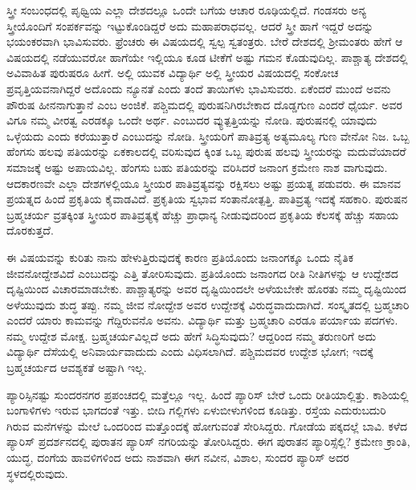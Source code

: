 ಸ್ತ್ರೀ ಸಂಬಂಧದಲ್ಲಿ ಪೃಥ್ವಿಯ ಎಲ್ಲಾ ದೇಶದಲ್ಲೂ ಒಂದೇ ಬಗೆಯ ಆಚಾರ ರೂಢಿಯಲ್ಲಿದೆ. ಗಂಡಸರು ಅನ್ಯ ಸ್ತ್ರೀಯೊಂದಿಗೆ ಸಂಪರ್ಕವನ್ನು ಇಟ್ಟುಕೊಂಡಿದ್ದರೆ ಅದು ಮಹಾಪರಾಧವಲ್ಲ. ಆದರೆ ಸ್ತ್ರೀ ಹಾಗೆ ಇದ್ದರೆ ಅದನ್ನು ಭಯಂಕರವಾಗಿ ಭಾವಿಸುವರು. ಫ್ರೆಂಚರು ಈ ವಿಷಯದಲ್ಲಿ ಸ್ವಲ್ಪ ಸ್ವತಂತ್ರರು. ಬೇರೆ ದೇಶದಲ್ಲಿ ಶ‍್ರೀಮಂತರು ಹೇಗೆ ಆ ವಿಷಯದಲ್ಲಿ ನಡೆಯುವರೋ ಹಾಗೆಯೇ ಇಲ್ಲಿಯೂ ಕೂಡ ಟೀಕೆಗೆ ಅಷ್ಟು ಗಮನ ಕೊಡುವುದಿಲ್ಲ. ಪಾಶ್ಚಾತ್ಯ ದೇಶದಲ್ಲಿ ಅವಿವಾಹಿತ ಪುರುಷರೂ ಹೀಗೆ. ಅಲ್ಲಿ ಯುವಕ ವಿದ್ಯಾರ್ಥಿ ಅಲ್ಲಿ ಸ್ತ್ರೀಯರ ವಿಷಯದಲ್ಲಿ ಸಂಕೋಚ ಪ್ರವೃತ್ತಿಯವನಾಗಿದ್ದರೆ ಅದೊಂದು ನ್ಯೂನತೆ ಎಂದು ತಂದೆ ತಾಯಿಗಳು ಭಾವಿಸುವರು. ಏಕೆಂದರೆ ಮುಂದೆ ಅವನು ಪೌರುಷ ಹೀನನಾಗುತ್ತಾನೆ ಎಂಬ ಅಂಜಿಕೆ. ಪಶ್ಚಿಮದಲ್ಲಿ ಪುರುಷನಿಗಿರಬೇಕಾದ ದೊಡ್ಡಗುಣ ಎಂದರೆ ಧೈರ್ಯ. ಅವರ  ವಿಗೂ ನಮ್ಮ ವೀರತ್ವ ಎರಡಕ್ಕೂ ಒಂದೇ ಅರ್ಥ.  ಎಂಬುದರ ವ್ಯುತ್ಪತ್ತಿಯನ್ನು ನೋಡಿ. ಪುರುಷನಲ್ಲಿ ಯಾವುದು ಒಳ್ಳೆಯದು ಎಂದು ಕರೆಯುತ್ತಾರೆ ಎಂಬುದನ್ನು ನೋಡಿ. ಸ್ತ್ರೀಯರಿಗೆ ಪಾತಿವ್ರತ್ಯ ಅತ್ಯಮೂಲ್ಯ ಗುಣ ವೇನೋ ನಿಜ. ಒಬ್ಬ ಹೆಂಗಸು ಹಲವು ಪತಿಯರನ್ನು ಏಕಕಾಲದಲ್ಲಿ ವರಿಸುವುದ ಕ್ಕಿಂತ ಒಬ್ಬ ಪುರುಷ ಹಲವು ಸ್ತ್ರೀಯರನ್ನು ಮದುವೆಯಾದರೆ ಸಮಾಜಕ್ಕೆ ಅಷ್ಟು ಅಪಾಯವಿಲ್ಲ. ಹೆಂಗಸು ಬಹು ಪತಿಯರನ್ನು ವರಿಸಿದರೆ ಜನಾಂಗ ಕ್ರಮೇಣ ನಾಶ ವಾಗುವುದು. ಆದಕಾರಣವೇ ಎಲ್ಲಾ ದೇಶಗಳಲ್ಲಿಯೂ ಸ್ತ್ರೀಯರ ಪಾತಿವ್ರತ್ಯವನ್ನು ರಕ್ಷಿಸಲು ಅಷ್ಟು ಪ್ರಯತ್ನ ಪಡುವರು. ಈ ಮಾನವ ಪ್ರಯತ್ನದ ಹಿಂದೆ ಪ್ರಕೃತಿಯ ಕೈವಾಡವಿದೆ. ಪ್ರಕೃತಿಯ ಸ್ವಭಾವ ಸಂತಾನೋತ್ಪತ್ತಿ. ಪಾತಿವ್ರತ್ಯ ಇದಕ್ಕೆ ಸಹಕಾರಿ. ಪುರುಷನ ಬ್ರಹ್ಮಚರ್ಯ ವ್ರತಕ್ಕಿಂತ ಸ್ತ್ರೀಯರ ಪಾತಿವ್ರತ್ಯಕ್ಕೆ ಹೆಚ್ಚು ಪ್ರಾಧಾನ್ಯ ನೀಡುವುದರಿಂದ ಪ್ರಕೃತಿಯ ಕೆಲಸಕ್ಕೆ ಹೆಚ್ಚು ಸಹಾಯ ದೊರಕುತ್ತದೆ.

ಈ ವಿಷಯವನ್ನು ಕುರಿತು ನಾನು ಹೇಳುತ್ತಿರುವುದಕ್ಕೆ ಕಾರಣ ಪ್ರತಿಯೊಂದು ಜನಾಂಗಕ್ಕೂ ಒಂದು ನೈತಿಕ ಜೀವನೋದ್ದೇಶವಿದೆ ಎಂಬುದನ್ನು ಎತ್ತಿ ತೋರಿಸುವುದು. ಪ್ರತಿಯೊಂದು ಜನಾಂಗದ ರೀತಿ ನೀತಿಗಳನ್ನು ಆ ಉದ್ದೇಶದ ದೃಷ್ಟಿಯಿಂದ ವಿಚಾರಮಾಡಬೇಕು. ಪಾಶ್ಚಾತ್ಯರನ್ನು ಅವರ ದೃಷ್ಟಿಯಿಂದಲೇ ಅಳೆಯಬೇಕೇ ಹೊರತು ನಮ್ಮ ದೃಷ್ಟಿಯಿಂದ ಅಳೆಯುವುದು ಶುದ್ಧ ತಪ್ಪು. ನಮ್ಮ ಜೀವ ನೋದ್ದೇಶ ಅವರ ಉದ್ದೇಶಕ್ಕೆ ವಿರುದ್ಧವಾದುದಾಗಿದೆ. ಸಂಸ್ಕೃತದಲ್ಲಿ ಬ್ರಹ್ಮಚಾರಿ ಎಂದರೆ ಯಾರು ಕಾಮವನ್ನು ಗೆದ್ದಿರುವನೊ ಅವನು. ವಿದ್ಯಾರ್ಥಿ ಮತ್ತು ಬ್ರಹ್ಮಚಾರಿ ಎರಡೂ ಪರ್ಯಾಯ ಪದಗಳು. ನಮ್ಮ ಉದ್ದೇಶ ಮೋಕ್ಷ. ಬ್ರಹ್ಮಚರ್ಯವಿಲ್ಲದೆ ಅದು ಹೇಗೆ ಸಿದ್ಧಿಸುವುದು? ಆದ್ದರಿಂದ ನಮ್ಮ ತರುಣರಿಗೆ ಅದು ವಿದ್ಯಾರ್ಥಿ ದೆಸೆಯಲ್ಲಿ ಅನಿವಾರ್ಯವಾದುದು ಎಂದು ವಿಧಿಸಲಾಗಿದೆ. ಪಶ್ಚಿಮದವರ ಉದ್ದೇಶ ಭೋಗ; ಇದಕ್ಕೆ ಬ್ರಹ್ಮಚರ್ಯದ ಆವಶ್ಯಕತೆ ಅಷ್ಟಾಗಿ ಇಲ್ಲ.

ಪ್ಯಾರಿಸ್ಸಿನಷ್ಟು ಸುಂದರನಗರ ಪ್ರಪಂಚದಲ್ಲಿ ಮತ್ತೆಲ್ಲೂ ಇಲ್ಲ. ಹಿಂದೆ ಪ್ಯಾರಿಸ್​ ಬೇರೆ ಒಂದು ರೀತಿಯಾಲ್ಲಿತ್ತು. ಕಾಶಿಯಲ್ಲಿ ಬಂಗಾಳಿಗಳು ಇರುವ ಭಾಗದಂತೆ ಇತ್ತು. ಬೀದಿ ಗಲ್ಲಿಗಳು ಏಳುಬೀಳುಗಳಿಂದ ಕೂಡಿತ್ತು. ರಸ್ತೆಯ ಎದುರುಬದುರಿ ಗಿರುವ ಮನೆಗಳನ್ನು ಮೇಲೆ ಒಂದರಿಂದ ಮತ್ತೊಂದಕ್ಕೆ ಹೋಗುವಂತೆ ಸೇರಿಸಿದ್ದರು. ಗೋಡೆಯ ಪಕ್ಕದಲ್ಲೆ ಬಾವಿ. ಕಳೆದ ಪ್ಯಾರಿಸ್​ ಪ್ರದರ್ಶನದಲ್ಲಿ ಪುರಾತನ ಪ್ಯಾರಿಸ್​ ನಗರಿಯನ್ನು ತೋರಿಸಿದ್ದರು. ಈಗ ಪುರಾತನ ಪ್ಯಾರಿಸ್ಸೆಲ್ಲಿ? ಕ್ರಮೇಣ ಕ್ರಾಂತಿ, ಯುದ್ಧ, ದಂಗೆಯ ಹಾವಳಿಗಳಿಂದ ಅದು ನಾಶವಾಗಿ ಈಗ ನವೀನ, ವಿಶಾಲ, ಸುಂದರ ಪ್ಯಾರಿಸ್​ ಅದರ ಸ್ಥಳದಲ್ಲಿರುವುದು.

